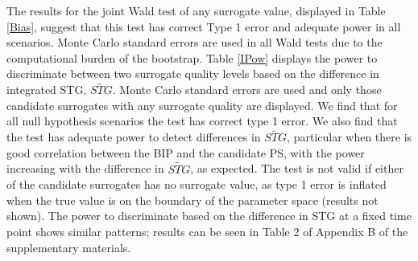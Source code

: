 \documentclass[times, doublespace]{simauth}
\begin{document}
The results for the joint Wald test of any surrogate value, displayed in Table \ref{Bias}, suggest that this test has correct Type 1 error and adequate power in all scenarios. Monte Carlo standard errors are used in all Wald tests due to the computational burden of the bootstrap. Table \ref{IPow} displays the power to discriminate between two surrogate quality levels based on the difference in integrated STG, $\widetilde{STG}$. Monte Carlo standard errors are used and only those candidate surrogates with any surrogate quality are displayed. We find that for all null hypothesis scenarios the test has correct type 1 error. We also find that the test has adequate power to detect differences in $\widetilde{STG}$, particular when there is good correlation between the BIP and the candidate PS, with the power increasing with the difference in $\widetilde{STG}$, as expected. The test is not valid if either of the candidate surrogates has no surrogate value, as type 1 error is inflated when the true value is on the boundary of the parameter space (results not shown). The power to discriminate based on the difference in STG at a fixed time point shows similar patterns; results can be seen in Table 2 of Appendix B of the supplementary materials.
\end{document}
